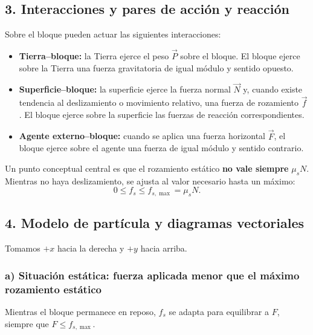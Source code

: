 \documentclass[12pt]{article}
\newcommand{\paso}[2]{%
  \subsection*{\color{AzulFisica}#1. #2}%
}
\begin{document}
\paso{3}{Interacciones y pares de acción y reacción}
Sobre el bloque pueden actuar las siguientes interacciones:
\begin{itemize}[itemsep=2pt]
  \item \textbf{Tierra--bloque:} la Tierra ejerce el peso \(\vec P\) sobre el bloque. El bloque ejerce sobre la Tierra una fuerza gravitatoria de igual módulo y sentido opuesto.
  \item \textbf{Superficie--bloque:} la superficie ejerce la fuerza normal \(\vec N\) y, cuando existe tendencia al deslizamiento o movimiento relativo, una fuerza de rozamiento \(\vec f\). El bloque ejerce sobre la superficie las fuerzas de reacción correspondientes.
  \item \textbf{Agente externo--bloque:} cuando se aplica una fuerza horizontal \(\vec F\), el bloque ejerce sobre el agente una fuerza de igual módulo y sentido contrario.
\end{itemize}

Un punto conceptual central es que el rozamiento estático \textbf{no vale siempre} \(\mu_sN\). Mientras no haya deslizamiento, se ajusta al valor necesario hasta un máximo:
\[
0\leq f_s\leq f_{s,\max}=\mu_sN.
\]

\paso{4}{Modelo de partícula y diagramas vectoriales}
Tomamos \(+x\) hacia la derecha y \(+y\) hacia arriba.

\subsubsection*{a) Situación estática: fuerza aplicada menor que el máximo rozamiento estático}
\begin{center}
\end{center}

Mientras el bloque permanece en reposo, \(f_s\) se adapta para equilibrar a \(F\), siempre que \(F\leq f_{s,\max}\).
\end{document}
